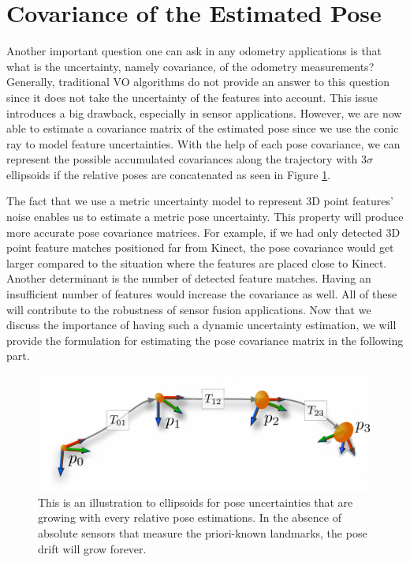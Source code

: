 \documentclass[12pt]{report}
\numberwithin{figure}{section}
\begin{document}
\section{Covariance of the Estimated Pose} \label{sc_covariance_estim} 

Another important question one can ask in any odometry applications is that
what is the uncertainty, namely covariance, of the odometry measurements?
Generally, traditional VO algorithms do not provide an answer to this question
since it does not take the uncertainty of the features into account.  This
issue introduces a big drawback, especially in sensor applications.  However,
we are now able to estimate a covariance matrix of the estimated pose since we
use the conic ray to model feature uncertainties.  With the help of each pose
covariance, we can represent the possible accumulated covariances along the
trajectory with $3\sigma$ ellipsoids if the relative poses are concatenated as
seen in Figure \ref{fig:pose_uncertainty}. 

The fact that we use a metric uncertainty model to represent 3D point features'
noise enables us to estimate a metric pose uncertainty. This property will
produce more accurate pose covariance matrices.  For example, if we had only
detected 3D point feature matches positioned far from Kinect, the pose
covariance would get larger compared to the situation where the features are
placed close to Kinect.  Another determinant is the number of detected feature
matches. Having an insufficient number of features would increase the
covariance as well.  All of these will contribute to the robustness of sensor
fusion applications.  Now that we discuss the importance of having such a
dynamic uncertainty estimation, we will provide the formulation for estimating
the pose covariance matrix in the following part. 

\begin{figure}[H] \centering
\includegraphics[width=0.7\linewidth,natwidth=640,natheight=640]
{fig/drawings/pose_uncertainty.pdf} \caption[Pose Uncertainty]{This is an
illustration to ellipsoids for pose uncertainties that are growing with every
relative pose estimations. In the absence of absolute sensors that measure the
priori-known landmarks, the pose drift will grow forever.}
\label{fig:pose_uncertainty} \end{figure}
\end{document}
